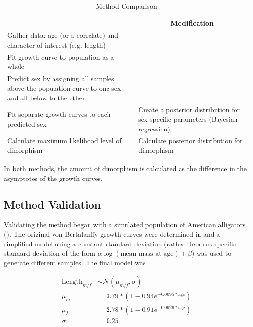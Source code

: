 \documentclass[letterpaper]{article}
\begin{document}
\begin{table}[H]
    \centering
    \caption{Method Comparison}
    \begin{tabularx}{\textwidth}{XX}
        \toprule
        \multicolumn{1}{c}{\cite{saittaEffectSizeStatistical2020}} & \multicolumn{1}{c}{Modification} \\
        \midrule
        Gather data: age (or a correlate) and character of interest (e.g. length) & \\
        Fit growth curve to population as a whole & \\
        Predict sex by assigning all samples above the population curve to one sex and all below to the other. & \\
        Fit separate growth curves to each predicted sex & Create a posterior distribution for sex-specific parameters (Bayesian regression) \\
        Calculate maximum likelihood level of dimorphism & Calculate posterior distribution for dimorphism \\
        \bottomrule
    \end{tabularx}
\end{table}

In both methods, the amount of dimorphism is calculated as the difference in the asymptotes of the growth curves.

\subsection{Method Validation}

Validating the method began with a simulated population of American alligators (). The original von Bertalanffy growth curves were determined in \cite{wilkinsonGrowthRatesAmerican1997} and a simplified model using a constant standard deviation (rather than sex-specific standard deviation of the form $\alpha \log(\text{mean mass at age}) + \beta$) was used to generate different samples. The final model was

\begin{align*}
\text{Length}_{ m / f } &\sim \mathcal{N}\left(\mu_{ m / f }, \sigma\right) \\
\mu_m &= 3.79 * \left(1 - 0.94e^{-0.0695 \ast \text{age}}\right) \\
\mu_f &= 2.78 * \left(1 - 0.91e^{-0.0926 \ast \text{age}}\right) \\
\sigma &= 0.25
\end{align*}
\end{document}

